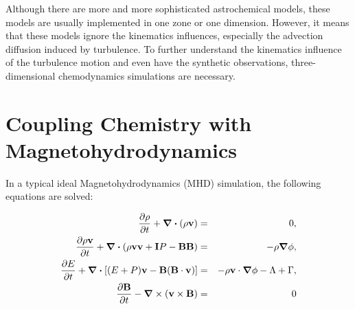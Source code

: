 Although there are more and more sophisticated astrochemical models, these models are usually implemented in one zone or one dimension. However, it means that these models ignore the kinematics influences, especially the advection diffusion induced by turbulence. To further understand the kinematics influence of the turbulence motion and even have the synthetic observations, three-dimensional chemodynamics simulations are necessary.

\section{Coupling Chemistry with Magnetohydrodynamics\label{sec:chemo}}
In a typical ideal Magnetohydrodynamics (MHD) simulation, the following equations are solved:

\begin{eqnarray}
    \frac{\partial \rho}{\partial t} + \div (\rho {\bf v}) & = & 0, \label{eq:mass} \\
    \frac{\partial \rho {\bf v}}{\partial t} + \div \left(\rho {\bf v} {\bf v} + {\bf I}P - {\bf B} {\bf B} \right) & = & - \rho \grad \phi, \label{eq:momentum} \\
    \frac{\partial E}{\partial t} + \div \left[ (E + P) {\bf v} - {\bf B} ({\bf B} \cdot {\bf v}) \right] & = & - {\rho} {\bf v} \cdot \grad \phi  - \Lambda + \Gamma, \label{eq:energy} \\
    \frac{\partial {\bf B}}{\partial t} - \grad \times ({\bf v} \times {\bf B}) & = & 0 \label{eq:induction}
\end{eqnarray}

